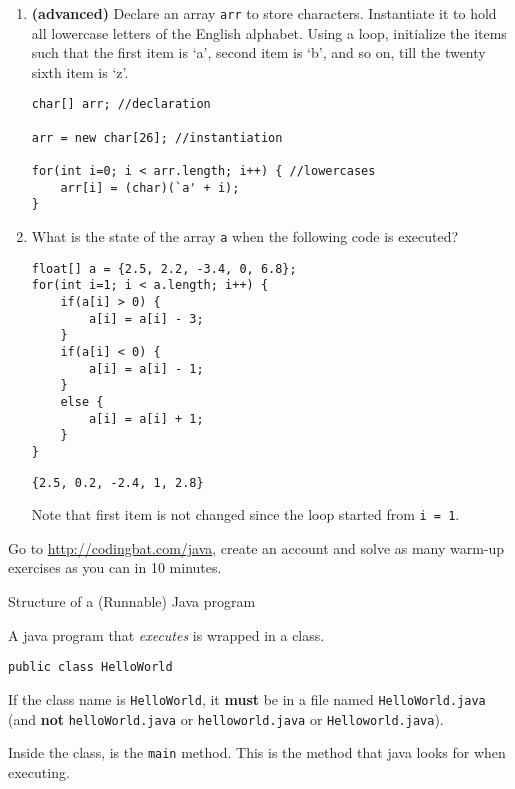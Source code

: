 \begin{questions}
\begin{enumerate}
\item \textbf{(advanced)} Declare an array \texttt{arr} to store characters. Instantiate it to hold all lowercase letters of the English alphabet. Using a loop, initialize the items such that the first item is `a', second item is `b', and so on, till the twenty sixth item is `z'.

\begin{solution}
\begin{lstlisting}
char[] arr; //declaration

arr = new char[26]; //instantiation

for(int i=0; i < arr.length; i++) { //lowercases
	arr[i] = (char)(`a' + i);
}
\end{lstlisting}
\end{solution}

\item What is the state of the array \texttt{a} when the following code is executed?

\begin{lstlisting}
float[] a = {2.5, 2.2, -3.4, 0, 6.8};
for(int i=1; i < a.length; i++) {
	if(a[i] > 0) {
		a[i] = a[i] - 3;
	}	
	if(a[i] < 0) {
		a[i] = a[i] - 1;
	}
	else {
		a[i] = a[i] + 1;
	}
}
\end{lstlisting}

\begin{solution}
\texttt{\{2.5, 0.2, -2.4, 1, 2.8\}}

Note that first item is not changed since the loop started from \texttt{i = 1}.	
\end{solution}
\end{enumerate}

\question Go to \url{http://codingbat.com/java}, create an account and solve as many warm-up exercises as you can in 10 minutes.

\vskip 1cm

\question Structure of a (Runnable) Java program

A java program that \emph{executes} is wrapped in a class.

\begin{verbatim}
public class HelloWorld	
\end{verbatim}

If the class name is \texttt{HelloWorld}, it \textbf{must} be in a file named \texttt{HelloWorld.java} (and \textbf{not} \texttt{helloWorld.java} or \texttt{helloworld.java} or \texttt{Helloworld.java}).

Inside the class, is the \texttt{main} method. This is the method that java looks for when executing.


\end{questions}
